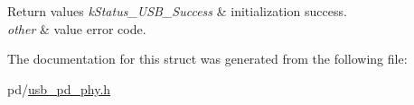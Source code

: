 \begin{DoxyRetVals}{Return values}
{\em k\-Status\-\_\-\-U\-S\-B\-\_\-\-Success} & initialization success. \\
\hline
{\em other} & value error code. \\
\hline
\end{DoxyRetVals}


The documentation for this struct was generated from the following file\-:\begin{DoxyCompactItemize}
\item 
pd/\hyperlink{usb__pd__phy_8h}{usb\-\_\-pd\-\_\-phy.\-h}\end{DoxyCompactItemize}

